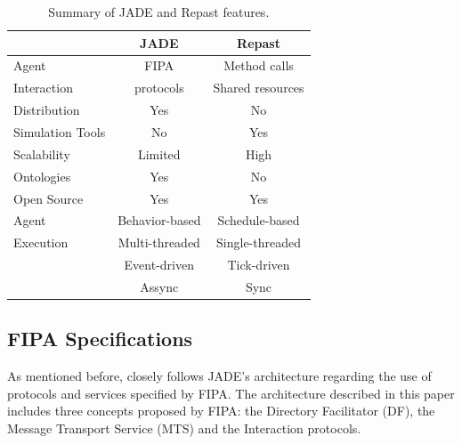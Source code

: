 \begin{table}[h]
	\caption{Summary of JADE and Repast features.}
	\label{tab:jadevsrep}
	\begin{center}
		\begin{tabular}{l|cc}
		\hline

		\hline
		\textbf{} & \textbf{JADE} & \textbf{Repast} \\ %
		\hline
			Agent 		& FIPA  	&  Method calls  \\ %
			Interaction	& protocols	&  Shared resources \\
		\hline
			Distribution & Yes & No \\ %
		\hline
			Simulation Tools & No & Yes \\ %
		\hline
			Scalability & Limited & High \\ %
		\hline
			Ontologies & Yes & No \\ %
		\hline
			Open Source & Yes & Yes \\ %
		\hline
			Agent  		& Behavior-based & Schedule-based  \\ %
			Execution	& Multi-threaded & Single-threaded \\ %
						& Event-driven   & Tick-driven 	   \\ %
						& Assync		 & Sync 		   \\ %
		\hline
		\end{tabular}
	\end{center}
\end{table} 

\subsection{FIPA Specifications}

As mentioned before, \apiname{} closely follows JADE's architecture regarding the use of protocols and services specified by FIPA. The architecture described in this paper includes three concepts proposed by FIPA: the Directory Facilitator (DF), the Message Transport Service (MTS) and the Interaction protocols.

